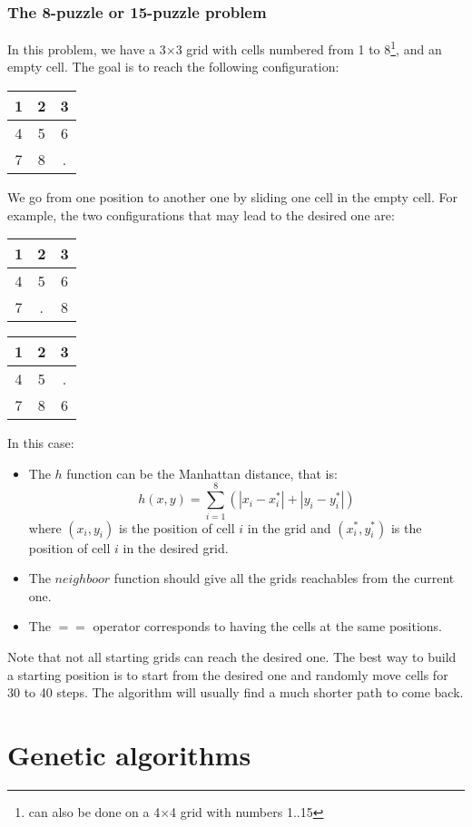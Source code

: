 \documentclass{ecnreport}
\begin{document}
\subsubsection{The 8-puzzle or 15-puzzle problem}

In this problem, we have a 3$\times$3 grid with cells numbered from 1 to 8\footnote{can also be done on a 4$\times$4 grid with numbers 1..15}, and an empty cell.
The goal is to reach the following configuration:
\begin{center}
 \begin{tabular}{|c|c|c|}
 \hline  
 1 &2&3\\\hline
 4 &5&6\\\hline
 7&8&.\\\hline
 \end{tabular}
\end{center}
We go from one position to another one by sliding one cell in the empty cell. For example, the two configurations that may lead to the desired one are:
\begin{center}
 
 \begin{tabular}{|c|c|c|}
 \hline  
 1 &2&3\\\hline
 4 &5&6\\\hline
 7&.&8\\\hline
 \end{tabular}\quad\quad\quad
 \begin{tabular}{|c|c|c|}
 \hline  
 1 &2&3\\\hline
 4 &5&.\\\hline
 7&8&6\\\hline
 \end{tabular}
\end{center}

In this case:
\begin{itemize}
 \item The $h$ function can be the Manhattan distance, that is:
 \begin{equation*}
  h(x,y) = \sum_{i=1}^8(|x_i - x_i^*| + |y_i - y_i^*|)
 \end{equation*}where $(x_i,y_i)$ is the position of cell $i$ in the grid and $(x_i^*,y_i^*)$ is the position
 of cell $i$ in the desired grid.
 \item The $neighboor$ function should give all the grids reachables from the current one.
 \item The $==$ operator corresponds to having the cells at the same positions.
\end{itemize}

Note that not all starting grids can reach the desired one. The best way to build a starting position is to start from the desired one and randomly move cells
for 30 to 40 steps. The algorithm will usually find a much shorter path to come back.



\section{Genetic algorithms}





 
\end{document}
